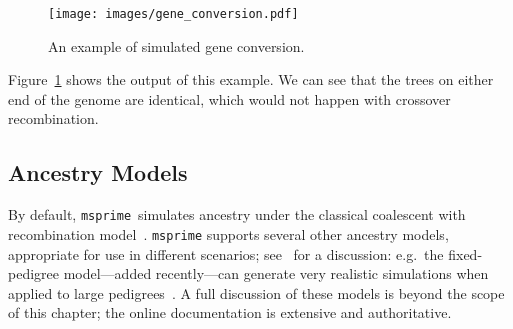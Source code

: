 \documentclass[graybox]{svmult}
\newcommand{\msprime}[0]{\texttt{msprime}}
\begin{document}
\begin{figure}
\begin{center}
\texttt{[image: images/gene\_conversion.pdf]}
\end{center}
\caption{\label{fig:gene_conversion} An example of simulated gene conversion.}
\end{figure}
Figure~\ref{fig:gene_conversion} shows the output of this example. We can see
that the trees on either end of the genome are identical, which would not
happen with crossover recombination.

\subsection{Ancestry Models}\label{ancestry-models}
By default, \msprime\ simulates ancestry under the
classical coalescent with recombination model~\citep{hudson1983properties}.
\texttt{msprime} supports several other ancestry models, appropriate for use in different
scenarios; see~\cite{baumdicker2022efficient} for a discussion:
e.g.\ the fixed-pedigree model---added recently---can generate very realistic simulations when applied to large
pedigrees~\cite{andersontrocme2023genes}. A full discussion of these
models is beyond the scope of this chapter; the online documentation
is extensive and authoritative.




\end{document}
